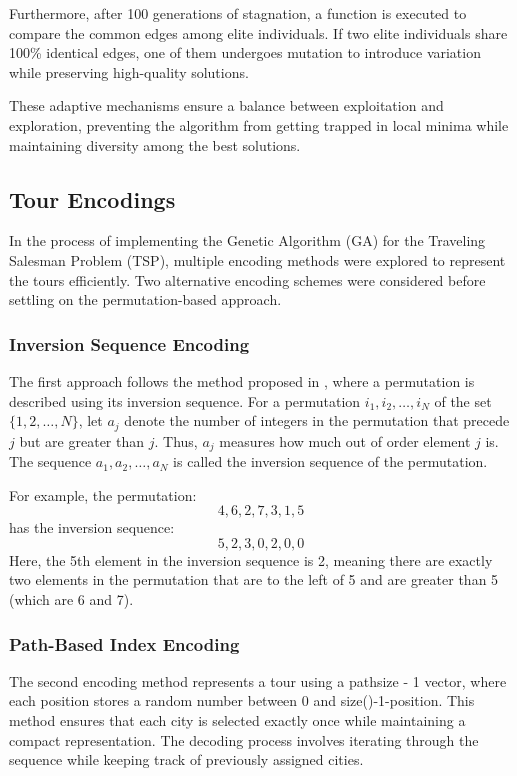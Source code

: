 \documentclass{article}
\begin{document}
Furthermore, after 100 generations of stagnation, a function is executed to compare the common edges among elite individuals. If two elite individuals share 100\% identical edges, one of them undergoes mutation to introduce variation while preserving high-quality solutions.  

These adaptive mechanisms ensure a balance between exploitation and exploration, preventing the algorithm from getting trapped in local minima while maintaining diversity among the best solutions.  

\subsection{Tour Encodings}  
In the process of implementing the Genetic Algorithm (GA) for the Traveling Salesman Problem (TSP), multiple encoding methods were explored to represent the tours efficiently. Two alternative encoding schemes were considered before settling on the permutation-based approach.  

\subsubsection{Inversion Sequence Encoding}  
The first approach follows the method proposed in \cite{ucoluk2002genetic}, where a permutation is described using its inversion sequence. For a permutation \(i_1, i_2, \dots, i_N\) of the set \(\{1, 2, \dots, N\}\), let \(a_j\) denote the number of integers in the permutation that precede \(j\) but are greater than \(j\). Thus, \(a_j\) measures how much out of order element \(j\) is. The sequence \(a_1, a_2, \dots, a_N\) is called the inversion sequence of the permutation.  

For example, the permutation:  
\[
4, 6, 2, 7, 3, 1, 5
\]  
has the inversion sequence:  
\[
5, 2, 3, 0, 2, 0, 0
\]  
Here, the 5th element in the inversion sequence is 2, meaning there are exactly two elements in the permutation that are to the left of 5 and are greater than 5 (which are 6 and 7).  

\subsubsection{Path-Based Index Encoding}  
The second encoding method represents a tour using a pathsize - 1 vector, where each position stores a random number between 0 and size()-1-position. This method ensures that each city is selected exactly once while maintaining a compact representation. The decoding process involves iterating through the sequence while keeping track of previously assigned cities.
\end{document}
